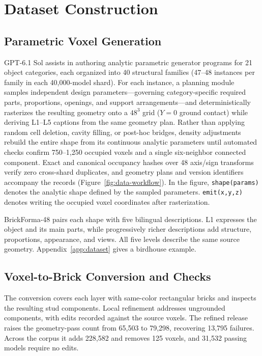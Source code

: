 \documentclass[letterpaper]{article} %
\begin{document}
\section{Dataset Construction}
\label{sec:dataset}
\subsection{Parametric Voxel Generation}
GPT-6.1 Sol assists in authoring analytic parametric generator programs for 21 object categories, each organized into 40 structural families (47--48 instances per family in each 40,000-model shard). For each instance, a planning module samples independent design parameters---governing category-specific required parts, proportions, openings, and support arrangements---and deterministically rasterizes the resulting geometry onto a $48^3$ grid ($Y{=}0$ ground contact) while deriving L1--L5 captions from the same geometry plan. Rather than applying random cell deletion, cavity filling, or post-hoc bridges, density adjustments rebuild the entire shape from its continuous analytic parameters until automated checks confirm 750--1,250 occupied voxels and a single six-neighbor connected component. Exact and canonical occupancy hashes over 48 axis/sign transforms verify zero cross-shard duplicates, and geometry plans and version identifiers accompany the records (Figure~\ref{fig:data-workflow}). %
In the figure, \texttt{shape(params)} denotes the analytic shape defined by the sampled parameters. \texttt{emit(x,y,z)} denotes writing the occupied voxel coordinates after rasterization.

BrickForma-48 pairs each shape with five bilingual descriptions. L1 expresses the object and its main parts, while progressively richer descriptions add structure, proportions, appearance, and views. All five levels describe the same source geometry. Appendix~\ref{app:dataset} gives a birdhouse example.

\subsection{Voxel-to-Brick Conversion and Checks}
The conversion covers each layer with same-color rectangular bricks and inspects the resulting stud components. Local refinement addresses ungrounded components, %
 with edits recorded against the source voxels. The refined release raises the geometry-pass count from 65,503 to 79,298, recovering 13,795 failures. Across the corpus it adds 228,582 and removes 125 voxels, and 31,532 passing models require no edits.
\end{document}
